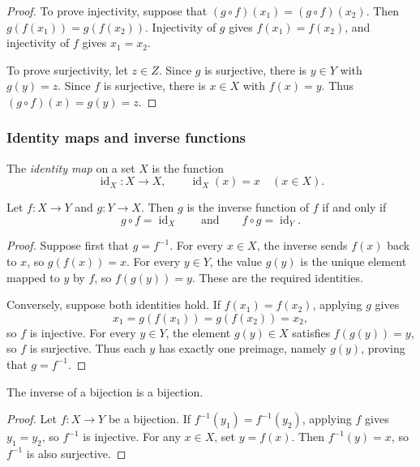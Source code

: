 \documentclass[11pt,a4paper]{amsart}
\begin{document}
\begin{proof}
  To prove injectivity, suppose that
  \((g\circ f)(x_1)=(g\circ f)(x_2)\). Then
  \(g(f(x_1))=g(f(x_2))\). Injectivity of \(g\) gives
  \(f(x_1)=f(x_2)\), and injectivity of \(f\) gives \(x_1=x_2\).

  To prove surjectivity, let \(z\in Z\). Since \(g\) is surjective,
  there is \(y\in Y\) with \(g(y)=z\). Since \(f\) is surjective,
  there is \(x\in X\) with \(f(x)=y\). Thus
  \((g\circ f)(x)=g(y)=z\).
\end{proof}

\subsubsection{Identity maps and inverse functions}

\begin{definition}
  The \emph{identity map} on a set \(X\) is the function
  \[
    \operatorname{id}_X\colon X\to X,
    \qquad \operatorname{id}_X(x)=x \quad (x\in X).
  \]
\end{definition}

\begin{theorem}\label{thm:inverse-identities}
  Let \(f\colon X\to Y\) and \(g\colon Y\to X\). Then \(g\)
  is the inverse function of \(f\) if and only if
  \[
    g\circ f=\operatorname{id}_X
    \qquad\text{and}\qquad
    f\circ g=\operatorname{id}_Y.
  \]
\end{theorem}

\begin{proof}
  Suppose first that \(g=f^{-1}\). For every \(x\in X\), the
  inverse sends \(f(x)\) back to \(x\), so \(g(f(x))=x\).
  For every \(y\in Y\), the value \(g(y)\) is the unique element
  mapped to \(y\) by \(f\), so \(f(g(y))=y\). These are the
  required identities.

  Conversely, suppose both identities hold. If \(f(x_1)=f(x_2)\),
  applying \(g\) gives
  \[
    x_1=g(f(x_1))=g(f(x_2))=x_2,
  \]
  so \(f\) is injective. For every \(y\in Y\), the element
  \(g(y)\in X\) satisfies \(f(g(y))=y\), so \(f\) is surjective.
  Thus each \(y\) has exactly one preimage, namely \(g(y)\), proving
  that \(g=f^{-1}\).
\end{proof}

\begin{corollary}\label{cor:inverse-bijection}
  The inverse of a bijection is a bijection.
\end{corollary}

\begin{proof}
  Let \(f\colon X\to Y\) be a bijection. If
  \(f^{-1}(y_1)=f^{-1}(y_2)\), applying \(f\) gives \(y_1=y_2\),
  so \(f^{-1}\) is injective. For any \(x\in X\), set \(y=f(x)\).
  Then \(f^{-1}(y)=x\), so \(f^{-1}\) is also surjective.
\end{proof}
\end{document}

